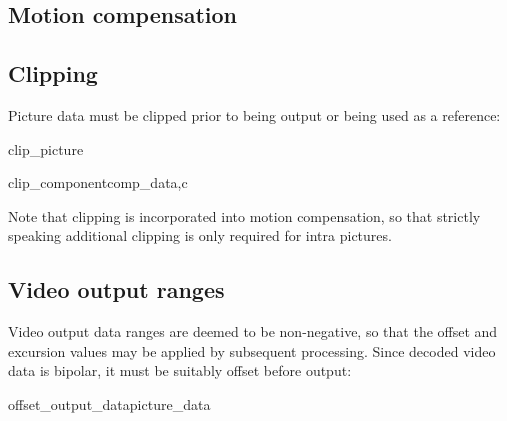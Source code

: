 

\subsection{Motion compensation}


\subsection{Clipping}
\label{pictureclip}

Picture data must be clipped prior to being output or being
used as a reference:

\begin{pseudo}{clip\_picture}{}
\bsEND
\end{pseudo}


\begin{pseudo}{clip\_component}{comp\_data,c}
\bsELSE
\bsEND
{}
     \bsEND
\bsEND
\end{pseudo}

\begin{informative}
Note that clipping is incorporated into motion compensation, so that strictly speaking additional
clipping is only required for intra pictures.
\end{informative}

\subsection{Video output ranges}
\label{videooutput}

Video output data ranges are deemed to be non-negative, so that the offset and excursion
 values may be applied by subsequent processing. Since decoded video data is bipolar, it must be suitably offset before output:

\begin{pseudo}{offset\_output\_data}{picture\_data}
    \bsELSE
    \bsEND
        \bsEND
    \bsEND
\bsEND
\end{pseudo}

